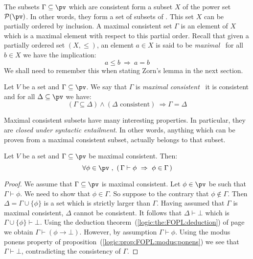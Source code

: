 The subsets $\Gamma\subseteq\pv$ which are consistent form a subset
$X$ of the power set ${\cal P}(\pv)$. In other words, they form a
set of subsets of \pv. This set $X$ can be partially ordered by
inclusion. A maximal consistent set $\Gamma$ is an element of $X$
which is a maximal element with respect to this partial order.
Recall that given a partially ordered set $(X,\leq)$, an element
$a\in X$ is said to be {\em maximal} \ifand\ for all $b\in X$ we
have the implication:
    \[
    a\leq b\ \Rightarrow\ a=b
    \]
We shall need to remember this when stating Zorn's lemma in the next
section.

\begin{defin}\label{logic:def:FOPL:semantics:maximal:consistent}
Let $V$ be a set and $\Gamma\subseteq\pv$. We say that $\Gamma$ is
{\em maximal consistent} \ifand\ it is consistent and for all
$\Delta\subseteq\pv$ we have:
    \[
    (\Gamma\subseteq\Delta)\land(\Delta\mbox{\ consistent})\
    \Rightarrow \Gamma=\Delta
    \]
\end{defin}

Maximal consistent subsets have many interesting properties. In
particular, they are {\em closed under syntactic entailment}. In
other words, anything which can be proven from a maximal consistent
subset, actually belongs to that subset.

\begin{prop}\label{logic:prop:FOPL:semantics:max:cons:deduction}
Let $V$ be a set and $\Gamma\subseteq\pv$ be maximal consistent.
Then:
    \[
    \forall\phi\in\pv\ ,\ (\,\Gamma\vdash\phi\ \Rightarrow\
    \phi\in\Gamma\,)
    \]
\end{prop}
\begin{proof}
We assume that $\Gamma\subseteq\pv$ is maximal consistent. Let
$\phi\in\pv$ be such that $\Gamma\vdash\phi$. We need to show that
$\phi\in\Gamma$. So suppose to the contrary that
$\phi\not\in\Gamma$. Then $\Delta=\Gamma\cup\{\phi\}$ is a set which
is strictly larger than $\Gamma$. Having assumed that $\Gamma$ is
maximal consistent, $\Delta$ cannot be consistent. It follows that
$\Delta\vdash\bot$ which is $\Gamma\cup\{\phi\}\vdash\bot$. Using
the deduction theorem~(\ref{logic:the:FOPL:deduction}) of
page~\pageref{logic:the:FOPL:deduction} we obtain
$\Gamma\vdash(\phi\to\bot)$. However, by assumption
$\Gamma\vdash\phi$. Using the modus ponens property of
proposition~(\ref{logic:prop:FOPL:modus:ponens}) we see that
$\Gamma\vdash\bot$, contradicting the consistency of $\Gamma$.
\end{proof}


